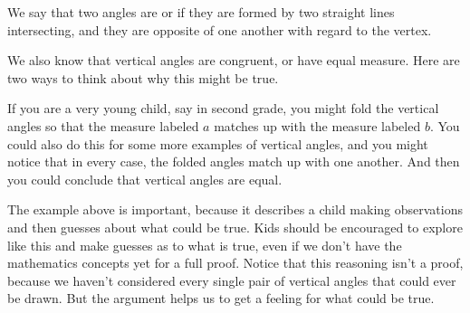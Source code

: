 \documentclass{ximera}
\begin{document}
We say that two angles are  or  if they are formed by two straight lines intersecting, and they are opposite of one another with regard to the vertex.
\begin{image}
\end{image}

We also know that vertical angles are congruent, or have equal measure. Here are two ways to think about why this might be true.

\begin{example}
If you are a very young child, say in second grade, you might fold the vertical angles so that the measure labeled $a$ matches up with the measure labeled $b$. You could also do this for some more examples of vertical angles, and you might notice that in every case, the folded angles match up with one another. And then you could conclude that vertical angles are equal.
\end{example}

The example above is important, because it describes a child making observations and then guesses about what could be true. Kids should be encouraged to explore like this and make guesses as to what is true, even if we don't have the mathematics concepts yet for a full proof. Notice that this reasoning isn't a proof, because we haven't considered every single pair of vertical angles that could ever be drawn. But the argument helps us to get a feeling for what could be true. 
\end{document}
